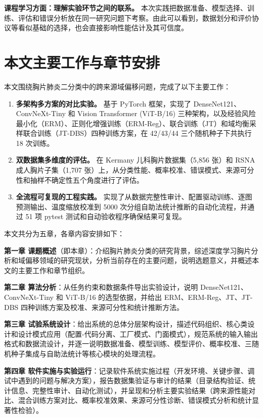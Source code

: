 \documentclass[12pt,a4paper,UTF8,openany]{ctexbook}
\begin{document}
\textbf{课程学习方面：理解实验环节之间的联系。} 本次实践把数据准备、模型选择、训练、评估和错误分析放在同一研究问题下考察。由此可以看到，数据划分和评价协议等看似基础的选择，也会直接影响性能估计及其可信度。

\section{本文主要工作与章节安排}

本文围绕胸片肺炎二分类中的跨来源域偏移问题，完成了以下主要工作：

\begin{enumerate}[label=(\arabic*)]
  \item \textbf{多架构多方案的对比实验。} 基于 PyTorch 框架，实现了 DenseNet121、ConvNeXt-Tiny 和 Vision Transformer (ViT-B/16) 三种架构，以及经验风险最小化（ERM）、正则化增强训练（ERM-Reg）、联合训练（JT）和域均衡采样联合训练（JT-DBS）四种训练方案，在 42/43/44 三个随机种子下共执行 18 次训练。
  \item \textbf{双数据集多维度的评估。} 在 Kermany 儿科胸片数据集（5,856 张）和 RSNA 成人胸片子集（1,707 张）上，从分类性能、概率校准、错误模式、来源可分性和抽样不确定性五个角度进行了评估。
  \item \textbf{全流程可复现的工程实践。} 实现了从数据完整性审计、配置驱动训练、逐图预测输出、温度缩放校准到 5000 次分组自助法统计推断的自动化流程，并通过 51 项 pytest 测试和自动验收程序确保结果可复现。
\end{enumerate}

本文共分为五章，各章内容安排如下：

\textbf{第一章 课题概述}（即本章）：介绍胸片肺炎分类的研究背景，综述深度学习胸片分析和域偏移领域的研究现状，分析当前存在的主要问题，说明选题意义，并概述本文的主要工作和章节组织。

\textbf{第二章 算法分析}：从任务约束和数据条件导出实验设计，说明 DenseNet121、ConvNeXt-Tiny 和 ViT-B/16 的选型依据，并给出 ERM、ERM-Reg、JT、JT-DBS 四种训练方案及校准、来源可分性和统计推断方法。

\textbf{第三章 试验系统设计}：给出系统的总体分层架构设计，描述代码组织、核心类设计和设计模式应用（配置-代码分离、工厂模式、门面模式），规范系统的输入输出格式和数据流设计，并逐一说明数据准备、模型训练、模型评价、概率校准、三随机种子集成与自助法统计等核心模块的处理流程。

\textbf{第四章 软件实施与实验运行}：记录软件系统实施过程（开发环境、关键步骤、调试中遇到的问题与解决方案），报告数据集验证与审计的结果（目录结构验证、统计信息、完整性审计、自动化测试），并呈现和分析主要实验结果（跨来源性能对比、混合训练方案对比、概率校准效果、来源可分性诊断、错误模式分析和统计显著性检验）。
\end{document}
